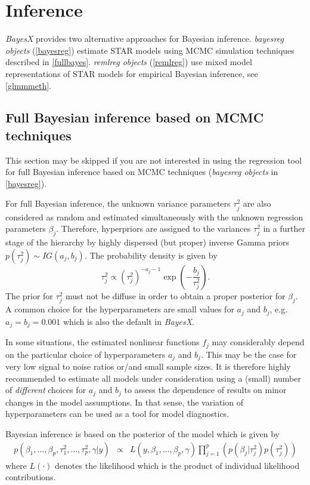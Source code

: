 \section{Inference}
\label{inference}

{\em BayesX} provides two alternative approaches for Bayesian
inference. {\em bayesreg objects} (\autoref{bayesreg}) estimate
STAR models using MCMC simulation techniques described in
\autoref{fullbayes}. {\em remlreg objects} (\autoref{remlreg}) use
mixed model representations of STAR models for empirical Bayesian
inference, see \autoref{glmmmeth}.



\subsection{Full Bayesian inference based on MCMC techniques}
\label{fullbayes}

This section may be skipped if you are not interested in using the
regression tool for full Bayesian inference based on MCMC
techniques ({\em bayesreg objects} in \autoref{bayesreg}).

For full Bayesian inference, the unknown variance parameters
$\tau_j^2$ are also considered as random and estimated
simultaneously with the unknown regression parameters $\beta_j$.
Therefore, hyperpriors are assigned to the variances $\tau^2_j$
in a further stage of the hierarchy by highly dispersed (but
proper) inverse Gamma priors $p(\tau^2_j) \sim IG(a_j,b_j)$. The
probability density is given by
$$
\tau_j^2 \propto (\tau^2_j)^{-a_j-1}
\exp\left(-\frac{b_j}{\tau^2_j}\right).
$$
The prior for $\tau_j^2$ must not be diffuse in order to obtain a
proper posterior for $\beta_j$. A common choice for the
hyperparameters are small values for $a_j$ and $b_j$, e.g.
$a_j=b_j=0.001$ which is also the default in {\em BayesX}.

In some situations, the estimated nonlinear functions $f_j$ may
considerably depend on the particular choice of hyperparameters
$a_j$ and $b_j$. This may be the case for very low signal to noise
ratios or/and small sample sizes. It is therefore highly
recommended to estimate all models under consideration using a
(small) number of {\em different} choices for $a_j$ and $b_j$ to
assess the dependence of results on minor changes in the model
assumptions. In that sense, the variation of hyperparameters can
be used as a tool for model diagnostics.


Bayesian inference is based on the posterior of the model which is
given by
\begin{equation}
\label{posterior}
\begin{array}{lll}
 p(\beta_1,\dots,\beta_p,\tau^2_1,\dots,\tau^2_p,\gamma|y) & \propto & L(y,\beta_1,\dots,\beta_p, \gamma)
\displaystyle \prod_{j=1}^p \left( p(\beta_j|\tau_j^2) p(\tau^2_j)
\right)
 \end{array}
\end{equation}
where  $L(\cdot)$ denotes the likelihood which is the product of
individual likelihood contributions.


